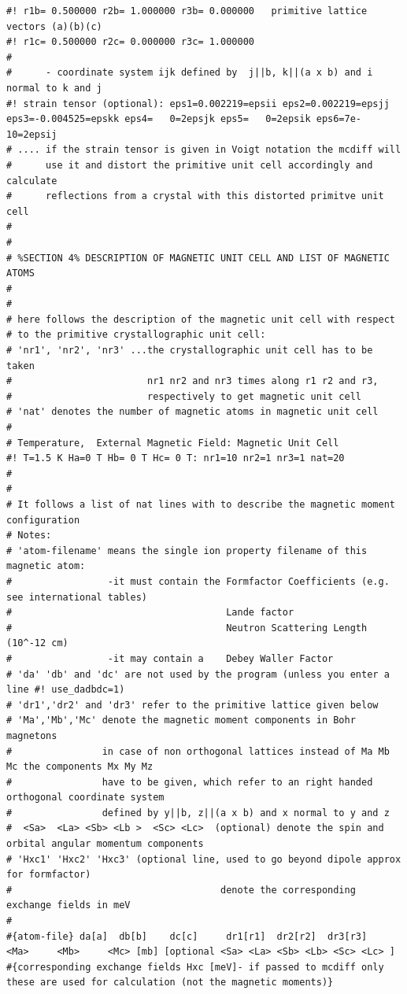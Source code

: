 {\begin{verbatim}
#! r1b= 0.500000 r2b= 1.000000 r3b= 0.000000   primitive lattice vectors (a)(b)(c)
#! r1c= 0.500000 r2c= 0.000000 r3c= 1.000000
#
#      - coordinate system ijk defined by  j||b, k||(a x b) and i normal to k and j
#! strain tensor (optional): eps1=0.002219=epsii eps2=0.002219=epsjj eps3=-0.004525=epskk eps4=   0=2epsjk eps5=   0=2epsik eps6=7e-10=2epsij
# .... if the strain tensor is given in Voigt notation the mcdiff will
#      use it and distort the primitive unit cell accordingly and calculate 
#      reflections from a crystal with this distorted primitve unit cell
#
#
# %SECTION 4% DESCRIPTION OF MAGNETIC UNIT CELL AND LIST OF MAGNETIC ATOMS
#
#
# here follows the description of the magnetic unit cell with respect
# to the primitive crystallographic unit cell:
# 'nr1', 'nr2', 'nr3' ...the crystallographic unit cell has to be taken 
#                        nr1 nr2 and nr3 times along r1 r2 and r3,
#                        respectively to get magnetic unit cell
# 'nat' denotes the number of magnetic atoms in magnetic unit cell
#
# Temperature,  External Magnetic Field: Magnetic Unit Cell
#! T=1.5 K Ha=0 T Hb= 0 T Hc= 0 T: nr1=10 nr2=1 nr3=1 nat=20 
#
#
# It follows a list of nat lines with to describe the magnetic moment configuration
# Notes:
# 'atom-filename' means the single ion property filename of this magnetic atom:
#                 -it must contain the Formfactor Coefficients (e.g. see international tables)
#                                      Lande factor
#                                      Neutron Scattering Length (10^-12 cm) 
#                 -it may contain a    Debey Waller Factor
# 'da' 'db' and 'dc' are not used by the program (unless you enter a line #! use_dadbdc=1)
# 'dr1','dr2' and 'dr3' refer to the primitive lattice given below
# 'Ma','Mb','Mc' denote the magnetic moment components in Bohr magnetons
#                in case of non orthogonal lattices instead of Ma Mb Mc the components Mx My Mz
#                have to be given, which refer to an right handed orthogonal coordinate system 
#                defined by y||b, z||(a x b) and x normal to y and z
#  <Sa>  <La> <Sb> <Lb >  <Sc> <Lc>  (optional) denote the spin and orbital angular momentum components 
# 'Hxc1' 'Hxc2' 'Hxc3' (optional line, used to go beyond dipole approx for formfactor)
#                                     denote the corresponding exchange fields in meV
#
#{atom-file} da[a]  db[b]    dc[c]     dr1[r1]  dr2[r2]  dr3[r3]   <Ma>     <Mb>     <Mc> [mb] [optional <Sa> <La> <Sb> <Lb> <Sc> <Lc> ]
#{corresponding exchange fields Hxc [meV]- if passed to mcdiff only these are used for calculation (not the magnetic moments)}

\end{verbatim}}
